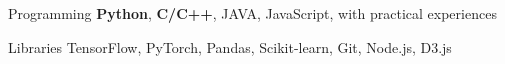 


\begin{cvskills}


\cvskill
{Programming} %
{\textbf{Python}, \textbf{C/C++}, JAVA, JavaScript, with practical experiences} %


\cvskill
{Libraries} %
{TensorFlow, PyTorch, Pandas, Scikit-learn, Git, Node.js, D3.js} %




\end{cvskills}